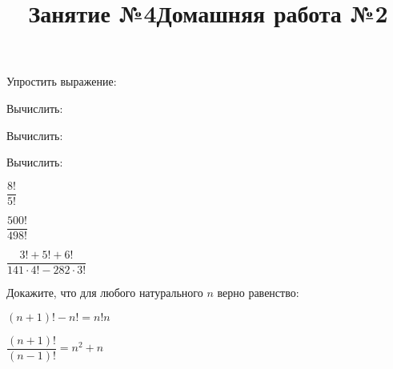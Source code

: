 \newpage
\title{Занятие №4}
	\begin{listofex}
		\item Упростить выражение:
	\begin{enumcols}[itemcolumns=2]
		\item {}
		\item {}
	\end{enumcols}
	\item Вычислить:
	\begin{enumcols}[itemcolumns=2]
		\item {}
		\item {}
		\item {}
	\end{enumcols}
	\item Вычислить:
	\begin{enumcols}[itemcolumns=2]
		\item {}
		\item {}
	\end{enumcols}
	\item Вычислить:
	\begin{enumcols}[itemcolumns=3]
		\item \( \dfrac{8!}{5!} \)
		\item \( \dfrac{500!}{498!} \)
		\item \( \dfrac{3!+5!+6!}{141\cdot4!-282\cdot3!} \)
	\end{enumcols}
	\item Докажите, что для любого натурального \( n \) верно равенство:
	\begin{enumcols}[itemcolumns=2]
		\item \( (n+1)!-n! = n!n \)
		\item \( \dfrac{(n+1)!}{(n-1)!}=n^2+n \)
	\end{enumcols}
	\item {}
\end{listofex}
\newpage
\title{Домашняя работа №2}
